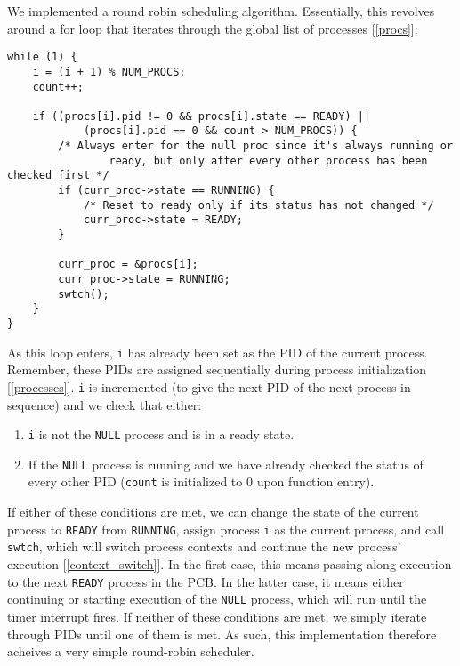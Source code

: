 \documentclass[12pt]{article}
\newcommand{\code}[1]{\colorbox{codegray}{\texttt{\footnotesize{#1}}}}
\begin{document}
We implemented a round robin scheduling algorithm.
Essentially, this revolves around a for loop that iterates
through the global list of processes [\ref{procs}]:
\begin{lstlisting}[caption={src/proc.c:scheduler}, label={scheduler}]
while (1) {
	i = (i + 1) % NUM_PROCS;
	count++;

	if ((procs[i].pid != 0 && procs[i].state == READY) || 
			(procs[i].pid == 0 && count > NUM_PROCS)) {
		/* Always enter for the null proc since it's always running or 
				ready, but only after every other process has been checked first */
		if (curr_proc->state == RUNNING) {
			/* Reset to ready only if its status has not changed */
			curr_proc->state = READY;
		}

		curr_proc = &procs[i];
		curr_proc->state = RUNNING;
		swtch();
	}
}
\end{lstlisting}
As this loop enters, \code{i} has already been set as the PID
of the current process.  Remember, these PIDs are assigned
sequentially during process initialization [\ref{processes}].
\code{i} is incremented (to give the next PID of the next
process in sequence) and we check that either:
\begin{enumerate}
	\item \code{i} is not the \code{NULL} process and is in a ready
	      state.
	\item If the \code{NULL} process is running and we have already
	      checked the status of every other PID (\code{count} is
	      initialized to 0 upon function entry).
\end{enumerate}
If either of these conditions are met, we can change the state of
the current process to \code{READY} from \code{RUNNING}, assign
process \code{i} as the current process, and call \code{swtch},
which will switch process contexts and continue the new process'
execution [\ref{context_switch}].  In the first case, this means
passing along execution to the next \code{READY} process in the
PCB\@.  In the latter case, it means either continuing or starting
execution of the \code{NULL} process, which will run until the
timer interrupt fires.  If neither of these conditions are met, we
simply iterate through PIDs until one of them is met.  As such,
this implementation therefore acheives a very simple round-robin
scheduler.
\end{document}
